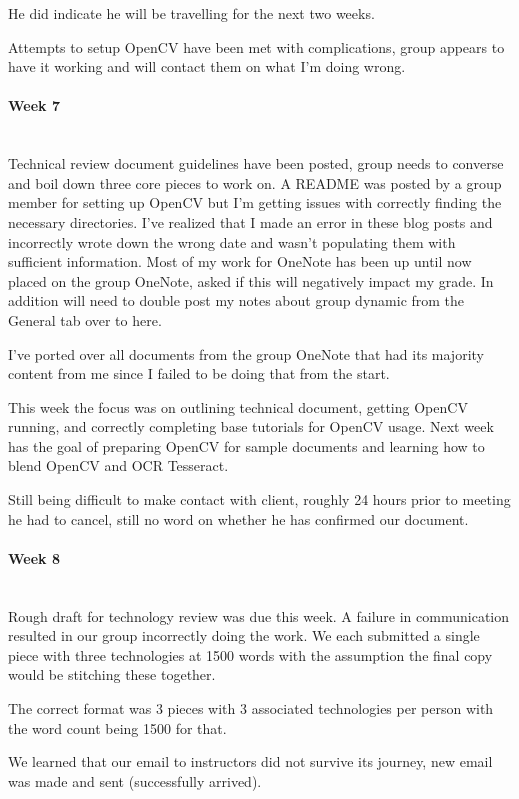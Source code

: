 \documentclass[article, onecolumn, draftclsnofoot,10pt, compsoc]{IEEEtran}
\begin{document}
He did indicate he will be travelling for the next two weeks.

Attempts to setup OpenCV have been met with complications, group appears to have it working and will contact them on what I'm doing wrong.


\paragraph{Week 7}
\mbox{}\\
Technical review document guidelines have been posted, group needs to converse and boil down three core pieces to work on. A README was posted by a group member for setting up OpenCV but I'm getting issues with correctly finding the necessary directories. I've realized that I made an error in these blog posts and incorrectly wrote down the wrong date and wasn't populating them with sufficient information. Most of my work for OneNote has been up until now placed on the group OneNote, asked if this will negatively impact my grade. In addition will need to double post my notes about group dynamic from the General tab over to here.

I've ported over all documents from the group OneNote that had its majority content from me since I failed to be doing that from the start.

This week the focus was on outlining technical document, getting OpenCV running, and correctly completing base tutorials for OpenCV usage. Next week has the goal of preparing OpenCV for sample documents and learning how to blend OpenCV and OCR Tesseract.

Still being difficult to make contact with client, roughly 24 hours prior to meeting he had to cancel, still no word on whether he has confirmed our document.


\paragraph{Week 8}
\mbox{}\\
Rough draft for technology review was due this week. A failure in communication resulted in our group incorrectly doing the work. We each submitted a single piece with three technologies at 1500 words with the assumption the final copy would be stitching these together. 
 
The correct format was 3 pieces with 3 associated technologies per person with the word count being 1500 for that.
 
We learned that our email to instructors did not survive its journey, new email was made and sent (successfully arrived).
 
\end{document}
